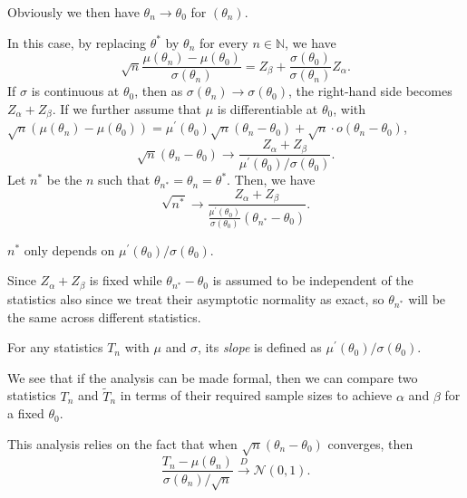 \begin{note}
	Obviously we then have \(\theta _n \to \theta _0\) for \((\theta _n)\).
\end{note}

In this case, by replacing \(\theta ^{\ast} \) by \(\theta _n\) for every \(n \in \mathbb{N} \), we have
\[
	\sqrt{n} \frac{\mu (\theta _n) - \mu (\theta _0)}{\sigma (\theta _n)}
	= Z_\beta + \frac{\sigma (\theta _0)}{\sigma (\theta _n)} Z_\alpha.
\]
If \(\sigma \) is continuous at \(\theta _0\), then as \(\sigma (\theta _n) \to \sigma (\theta _0)\), the right-hand side becomes \(Z_\alpha + Z_\beta \). If we further assume that \(\mu \) is differentiable at \(\theta _0\), with \(\sqrt{n} (\mu (\theta _n) - \mu (\theta _0)) = \mu ^{\prime} (\theta _0) \sqrt{n} (\theta _n - \theta _0) + \sqrt{n} \cdot o(\theta _n - \theta _0)\),
\[
	\sqrt{n} (\theta _n - \theta _0)
	\to \frac{Z_\alpha + Z_\beta }{\mu ^{\prime} (\theta _0) / \sigma (\theta _0)}.
\]
Let \(n^{\ast} \) be the \(n\) such that \(\theta _{n^{\ast} } = \theta _n = \theta ^{\ast} \). Then, we have
\[
	\sqrt{n^{\ast} }
	\to \frac{Z_\alpha + Z_\beta }{\frac{\mu ^{\prime} (\theta _0)}{\sigma (\theta _0)} (\theta _{n^{\ast} } - \theta _0)}.
\]

\begin{note}
	\(n^{\ast} \) only depends on \(\mu ^{\prime} (\theta _0) / \sigma (\theta _0)\).
\end{note}
\begin{explanation}
	Since \(Z_\alpha + Z_\beta \) is fixed while \(\theta _{n^{\ast} } - \theta _0\) is assumed to be independent of the statistics also since we treat their asymptotic normality as exact, so \(\theta _{n^{\ast} }\) will be the same across different statistics.
\end{explanation}

\begin{definition}[Slope]\label{def:slope}
	For any statistics \(T_n\) with \(\mu \) and \(\sigma \), its \emph{slope} is defined as  \(\mu ^{\prime} (\theta _0) / \sigma (\theta _0)\).
\end{definition}

We see that if the analysis can be made formal, then we can compare two statistics \(T_n\) and \(\widetilde{T} _n\) in terms of their required sample sizes to achieve \(\alpha \) and \(\beta \) for a fixed \(\theta _0\).

\begin{remark}
	This analysis relies on the fact that when \(\sqrt{n} (\theta _n - \theta _0)\) converges, then
	\[
		\frac{T_n - \mu (\theta _n)}{\sigma (\theta _n) / \sqrt{n} } \overset{D}{\to} \mathcal{N} (0, 1).
	\]
\end{remark}